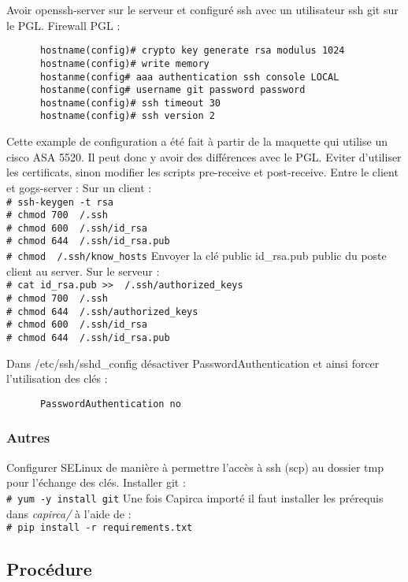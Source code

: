 \documentclass{article}
\newcommand{\shellcmdd}[1]{\\\indent\indent\texttt{\footnotesize\# #1}}
\begin{document}
      Avoir openssh-server sur le serveur et configuré ssh avec un utilisateur ssh git sur le PGL. \bigbreak
      \noindent Firewall PGL : \smallbreak
\begin{verbatim}
      hostname(config)# crypto key generate rsa modulus 1024
      hostname(config)# write memory
      hostanme(config# aaa authentication ssh console LOCAL
      hostanme(config# username git password password
      hostname(config)# ssh timeout 30
      hostname(config)# ssh version 2
\end{verbatim}
      Cette example de configuration a été fait à partir de la maquette qui utilise un cisco ASA 5520.
      Il peut donc y avoir des différences avec le PGL. Eviter d'utiliser les certificats, sinon modifier les scripts
      pre-receive et post-receive.
      \noindent Entre le client et gogs-server : \bigbreak
      Sur un client :
      \shellcmdd{ssh-keygen -t rsa}
      \shellcmdd{chmod 700 ~/.ssh}
      \shellcmdd{chmod 600 ~/.ssh/id\_rsa}
      \shellcmdd{chmod 644 ~/.ssh/id\_rsa.pub}
      \shellcmdd{chmod  ~/.ssh/know\_hosts} \smallbreak
      Envoyer la clé public id\_rsa.pub public du poste client au server. \bigbreak
      Sur le serveur :
      \shellcmdd{cat id\_rsa.pub >> ~/.ssh/authorized\_keys}
      \shellcmdd{chmod 700 ~/.ssh}
      \shellcmdd{chmod 644 ~/.ssh/authorized\_keys}
      \shellcmdd{chmod 600 ~/.ssh/id\_rsa}
      \shellcmdd{chmod 644 ~/.ssh/id\_rsa.pub} \smallbreak

      \noindent Dans /etc/ssh/sshd\_config désactiver PasswordAuthentication et ainsi forcer l'utilisation des clés :
\begin{verbatim}
      PasswordAuthentication no
\end{verbatim}

    \subsubsection{Autres}

      Configurer SELinux de manière à permettre l'accès à ssh (scp) au dossier tmp pour l'échange des clés.
      \noindent Installer git : \shellcmdd{yum -y install git} \smallbreak
      \noindent Une fois Capirca importé il faut installer les prérequis dans \textit{capirca/} à l'aide de :
      \shellcmdd{pip install -r requirements.txt}

    \subsection{Procédure}
\end{document}
